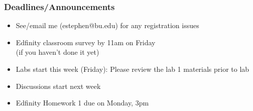 
\begin{frame}
    \frametitle{Deadlines/Announcements}
\begin{itemize}
            \item See/email me (estephen@bu.edu) for any registration issues
            \item Edfinity classroom survey by 11am on Friday \\
            (if you haven't done it yet)
            \item Labs start this week (Friday): Please review the lab 1 materials prior to lab
            \item Discussions start next week
            \item Edfinity Homework 1 due on Monday, 3pm
        \end{itemize}
\end{frame}
